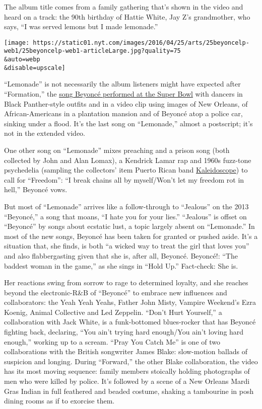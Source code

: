 The album title comes from a family gathering that's shown in the video
and heard on a track: the 90th birthday of Hattie White, Jay Z's
grandmother, who says, ``I was served lemons but I made lemonade.''

\texttt{[image: https://static01.nyt.com/images/2016/04/25/arts/25beyoncelp-web1/25beyoncelp-web1-articleLarge.jpg?quality=75\\\&auto=webp\\\&disable=upscale]}

``Lemonade'' is not necessarily the album listeners might have expected
after ``Formation,'' the
\href{http://www.nytimes.com/2016/02/07/arts/music/beyonce-formation-super-bowl-video.html}{song
Beyoncé performed at the Super Bowl} with dancers in Black Panther-style
outfits and in a video clip using images of New Orleans, of
African-Americans in a plantation mansion and of Beyoncé atop a police
car, sinking under a flood. It's the last song on ``Lemonade,'' almost a
postscript; it's not in the extended video.

One other song on ``Lemonade'' mixes preaching and a prison song (both
collected by John and Alan Lomax), a Kendrick Lamar rap and 1960s
fuzz-tone psychedelia (sampling the collectors' item Puerto Rican band
\href{http://www.nowagainrecords.com/kaleidoscope/}{Kaleidoscope}) to
call for ``Freedom'': ``I break chains all by myself/Won't let my
freedom rot in hell,'' Beyoncé vows.

But most of ``Lemonade'' arrives like a follow-through to ``Jealous'' on
the 2013 ``Beyoncé,'' a song that moans, ``I hate you for your lies.''
``Jealous'' is offset on ``Beyoncé'' by songs about ecstatic lust, a
topic largely absent on ``Lemonade.'' In most of the new songs, Beyoncé
has been taken for granted or pushed aside. It's a situation that, she
finds, is both ``a wicked way to treat the girl that loves you'' and
also flabbergasting given that she is, after all, Beyoncé. Beyoncé!:
``The baddest woman in the game,'' as she sings in ``Hold Up.''
Fact-check: She is.

Her reactions swing from sorrow to rage to determined loyalty, and she
reaches beyond the electronic-R\&B of ``Beyoncé'' to embrace new
influences and collaborators: the Yeah Yeah Yeahs, Father John Misty,
Vampire Weekend's Ezra Koenig, Animal Collective and Led Zeppelin.
``Don't Hurt Yourself,'' a collaboration with Jack White, is a
funk-bottomed blues-rocker that has Beyoncé fighting back, declaring,
``You ain't trying hard enough/You ain't loving hard enough,'' working
up to a scream. ``Pray You Catch Me'' is one of two collaborations with
the British songwriter James Blake: slow-motion ballads of suspicion and
longing. During ``Forward,'' the other Blake collaboration, the video
has its most moving sequence: family members stoically holding
photographs of men who were killed by police. It's followed by a scene
of a New Orleans Mardi Gras Indian in full feathered and beaded costume,
shaking a tambourine in posh dining rooms as if to exorcise them.

